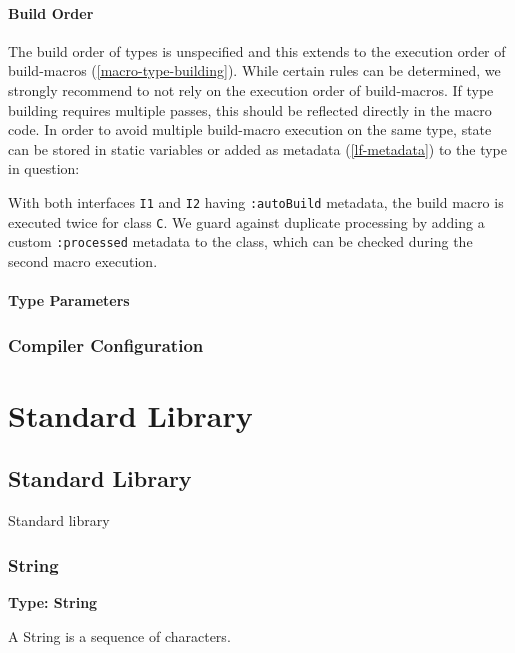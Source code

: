 \documentclass[a4paper,oneside]{book}
\newcommand{\type}[1]{\texttt{#1}}
\newcommand{\expr}[1]{\texttt{#1}}
\newenvironment{myshaded}
  {\def\FrameCommand{\fboxsep=\topsep\colorbox{bgcolor}}%
  \MakeFramed {\advance\hsize-\width \FrameRestore}}%
 {\endMakeFramed}
\newcommand{\define}[3][Definition]
	{\begin{myshaded}\noindent\textbf{#1: #2}\par\nobreak\noindent\ignorespaces#3\label{def:#2}\end{myshaded}}
\newcommand{\tref}[2]{#1 (\ref{#2})}
\newcommand{\haxe}[2][]{%
}
\begin{document}
\subsection{Build Order}
\label{macro-limitations-build-order}

The build order of types is unspecified and this extends to the execution order of \tref{build-macros}{macro-type-building}. While certain rules can be determined, we strongly recommend to not rely on the execution order of build-macros. If type building requires multiple passes, this should be reflected directly in the macro code. In order to avoid multiple build-macro execution on the same type, state can be stored in static variables or added as \tref{metadata}{lf-metadata} to the type in question:

\haxe{assets/MacroBuildOrder.hx}

With both interfaces \type{I1} and \type{I2} having \expr{:autoBuild} metadata, the build macro is executed twice for class \type{C}. We guard against duplicate processing by adding a custom \expr{:processed} metadata to the class, which can be checked during the second macro execution.


\subsection{Type Parameters}
\label{macro-limitations-type-parameters}


\section{Compiler Configuration}
\label{macro-compiler-configuration}




\part{Standard Library}

\chapter{Standard Library}
\label{std}

Standard library

\section{String}
\label{std-String}

\define[Type]{String}{A String is a sequence of characters.}
\end{document}
